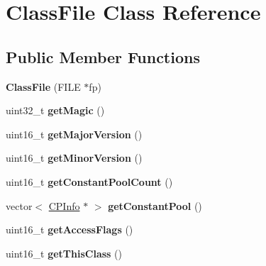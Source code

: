 \hypertarget{classClassFile}{}\section{Class\+File Class Reference}
\label{classClassFile}
\subsection*{Public Member Functions}
\begin{DoxyCompactItemize}
\item 
{\bfseries Class\+File} (F\+I\+LE $\ast$fp)\hypertarget{classClassFile_aed7c4bc94d4d7aff8785a262befa19fc}{}\label{classClassFile_aed7c4bc94d4d7aff8785a262befa19fc}

\item 
uint32\+\_\+t {\bfseries get\+Magic} ()\hypertarget{classClassFile_a7b981e486aada980cf8aa77669f4f578}{}\label{classClassFile_a7b981e486aada980cf8aa77669f4f578}

\item 
uint16\+\_\+t {\bfseries get\+Major\+Version} ()\hypertarget{classClassFile_aecde28e5d51413a4f1856385e0a2c642}{}\label{classClassFile_aecde28e5d51413a4f1856385e0a2c642}

\item 
uint16\+\_\+t {\bfseries get\+Minor\+Version} ()\hypertarget{classClassFile_a98a3170782cb82940f317f06f90c9398}{}\label{classClassFile_a98a3170782cb82940f317f06f90c9398}

\item 
uint16\+\_\+t {\bfseries get\+Constant\+Pool\+Count} ()\hypertarget{classClassFile_a72ea0eac7a8252056ee0c615afcd76fc}{}\label{classClassFile_a72ea0eac7a8252056ee0c615afcd76fc}

\item 
vector$<$ \hyperlink{classCPInfo}{C\+P\+Info} $\ast$ $>$ {\bfseries get\+Constant\+Pool} ()\hypertarget{classClassFile_a6268c973fcaf6247f7fe338f3ee54d7a}{}\label{classClassFile_a6268c973fcaf6247f7fe338f3ee54d7a}

\item 
uint16\+\_\+t {\bfseries get\+Access\+Flags} ()\hypertarget{classClassFile_a0426eeb52b8bcd0dfbee9dcaf368ad09}{}\label{classClassFile_a0426eeb52b8bcd0dfbee9dcaf368ad09}

\item 
uint16\+\_\+t {\bfseries get\+This\+Class} ()\hypertarget{classClassFile_a54c12b8a159a7952c668c094df9a6862}{}\label{classClassFile_a54c12b8a159a7952c668c094df9a6862}


\end{DoxyCompactItemize}
